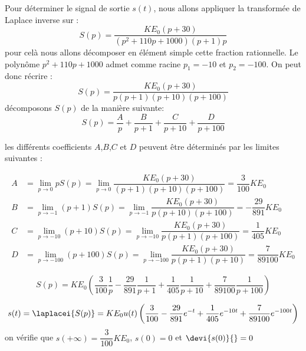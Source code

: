\question{}
Pour déterminer le signal de sortie $s(t)$, nous allons appliquer la 
transformée de Laplace inverse sur :
$$
S(p) = \dfrac{KE_0(p+30)}{(p^2+110p+1000)(p+1)p}
$$
pour celà nous allons décomposer en élément simple cette fraction rationnelle. 
Le polynôme $p^2+110p+1000$ admet comme racine $p_1=-10$ et $p_2=-100$. 
On peut donc récrire : 
$$
S(p)=\dfrac{KE_0(p+30)}{p(p+1)(p+10)(p+100)}
$$
décomposons $S(p)$ de la manière suivante:
$$
S(p)=\dfrac{A}{p}+\dfrac{B}{p+1}+\dfrac{C}{p+10}+\dfrac{D}{p+100}
$$

les différents coefficients $A$,$B$,$C$ et $D$ peuvent être déterminés par 
les limites suivantes :

\begin{align*}
    A&=\lim\limits_{p \rightarrow 0} p S(p) = 
    \lim\limits_{p \rightarrow 0} 
    \dfrac{KE_0(p+30)}{(p+1)(p+10)(p+100)} =
    \dfrac{3}{100}KE_0 \\
    B&=\lim\limits_{p \rightarrow -1} (p+1) S(p) = 
    \lim\limits_{p \rightarrow -1} 
    \dfrac{KE_0(p+30)}{p(p+10)(p+100)}=
    -\dfrac{29}{891}KE_0\\
    C&=\lim\limits_{p \rightarrow -10} (p+10) S(p) = 
    \lim\limits_{p \rightarrow -10} 
    \dfrac{KE_0(p+30)}{p(p+1)(p+100)}=
    \dfrac{1}{405}KE_0 \\
    D&=\lim\limits_{p \rightarrow -100} (p+100) S(p) = 
    \lim\limits_{p \rightarrow -100} 
    \dfrac{KE_0(p+30)}{p(p+1)(p+10)}=
    \dfrac{7}{89100}KE_0 
\end{align*}

$$
S(p) = KE_0\left(\dfrac{3}{100}  \dfrac{1}{p} -\dfrac{29}{891}\dfrac{1}{p+1} +
                                 \dfrac{1}{405}\dfrac{1}{p+10} + 
                                 \dfrac{7}{89100}\dfrac{1}{p+100} \right)
$$

$$
s(t) = \laplacei{S(p)} = KE_0u(t)\left(\dfrac{3}{100} - 
                         \dfrac{29}{891}e^{-t}+\dfrac{1}{405}e^{-10t}+
                         \dfrac{7}{89100}e^{-100t} \right) 
$$
on vérifie que $s(+\infty)=\dfrac{3}{100}KE_0$, $s(0)=0$ et $\devi{s(0)}{}=0$
\begin{center}
\end{center}


